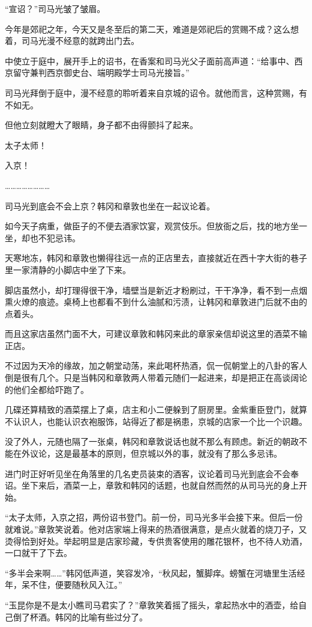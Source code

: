 “宣诏？”司马光皱了皱眉。

今年是郊祀之年，今天又是冬至后的第二天，难道是郊祀后的赏赐不成？这么想着，司马光漫不经意的就跨出门去。

中使立于庭中，展开手上的诏书，在香案和司马光父子面前高声道：“给事中、西京留守兼判西京御史台、端明殿学士司马光接旨。”

司马光拜倒于庭中，漫不经意的聆听着来自京城的诏令。就他而言，这种赏赐，有不如无。

但他立刻就瞪大了眼睛，身子都不由得颤抖了起来。

太子太师！

入京！

……………………

司马光到底会不会上京？韩冈和章敦也坐在一起议论着。

如今天子病重，做臣子的不便去酒家饮宴，观赏伎乐。但放衙之后，找的地方坐一坐，却也不犯忌讳。

天寒地冻，韩冈和章敦也懒得往远一点的正店里去，直接就近在西十字大街的巷子里一家清静的小脚店中坐了下来。

脚店虽然小，却打理得很干净，墙壁当是新近才粉刷过，干干净净，看不到一点烟熏火燎的痕迹。桌椅上也都看不到什么油腻和污渍，让韩冈和章敦进门后就不由的点着头。

而且这家店虽然门面不大，可建议章敦和韩冈来此的章家亲信却说这里的酒菜不输正店。

不过因为天冷的缘故，加之朝堂动荡，来此喝杯热酒，侃一侃朝堂上的八卦的客人倒是很有几个。只是当韩冈和章敦两人带着元随们一起进来，却是把正在高谈阔论的他们全都给吓跑了。

几碟还算精致的酒菜摆上了桌，店主和小二便躲到了厨房里。金紫重臣登门，就算不认识人，也能认识衣袍服饰，站得近了都是祸患，京城的店家一个比一个识趣。

没了外人，元随也隔了一张桌，韩冈和章敦说话也就不那么有顾虑。新近的朝政不能在外议论，这是最基本的原则，但京城以外的事，就没有了那么多忌讳。

进门时正好听见坐在角落里的几名吏员装束的酒客，议论着司马光到底会不会奉诏。坐下来后，酒菜一上，章敦和韩冈的话题，也就自然而然的从司马光的身上开始。

“太子太师，入京之招，两份诏书登门。前一份，司马光多半会接下来。但后一份就难说。”章敦笑说着。他对店家端上得来的热酒很满意，是点火就着的烧刀子，又烫得恰到好处。举起明显是店家珍藏，专供贵客使用的雕花银杯，也不待人劝酒，一口就干了下去。

“多半会来啊……”韩冈低声道，笑容发冷，“秋风起，蟹脚痒。螃蟹在河塘里生活经年，呆不住，便要随秋风入江。”

“玉昆你是不是太小瞧司马君实了？”章敦笑着摇了摇头，拿起热水中的酒壶，给自己倒了杯酒。韩冈的比喻有些过分了。

